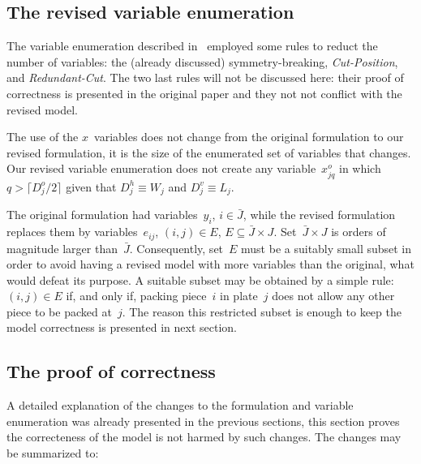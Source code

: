 \documentclass[runningheads]{llncs}
\begin{document}
\subsection{The revised variable enumeration}

The variable enumeration described in~\cite{furini:2016} employed some rules to reduct the number of variables: the (already discussed) symmetry-breaking, \emph{Cut-Position}, and \emph{Redundant-Cut}.
The two last rules will not be discussed here: their proof of correctness is presented in the original paper and they not not conflict with the revised model.

The use of the \(x\)~variables does not change from the original formulation to our revised formulation, it is the size of the enumerated set of variables that changes.
Our revised variable enumeration does not create any variable~\(x^o_{jq}\) in which \(q > \lceil D^o_j / 2 \rceil \) given that \(D^h_j \equiv W_j\) and \(D^v_j \equiv L_j\).

The original formulation had variables~\(y_i\), \(i \in \bar{J}\), while the revised formulation replaces them by variables~\(e_{ij}\), \((i, j) \in E\), \(E \subseteq \bar{J} \times J\).
Set~\(\bar{J} \times J\) is orders of magnitude larger than~\(\bar{J}\).
Consequently, set~\(E\) must be a suitably small subset in order to avoid having a revised model with more variables than the original, what would defeat its purpose.
A suitable subset may be obtained by a simple rule: \((i, j) \in E\) if, and only if, packing piece~\(i\) in plate~\(j\) does not allow any other piece to be packed at~\(j\).
The reason this restricted subset is enough to keep the model correctness is presented in next section.


\subsection{The proof of correctness}

A detailed explanation of the changes to the formulation and variable enumeration was already presented in the previous sections, this section proves the correcteness of the model is not harmed by such changes. The changes may be summarized to:
\end{document}
